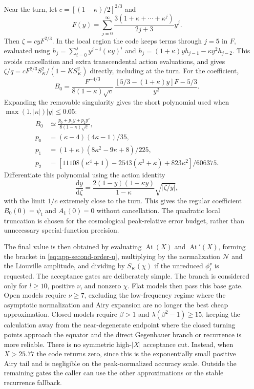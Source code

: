 \documentclass[11pt,a4paper]{article}
\newcommand{\dd}{\mathrm{d}}
\newcommand{\SK}{S_K}
\newcommand{\Ai}{\operatorname{Ai}}
\newcommand{\abs}[1]{\left|#1\right|}
\begin{document}
Near the turn, let \(c=[(1-\kappa)/2]^{2/3}\) and
\[
 F(y)=\sum_{j=0}^{\infty}
 \frac{3(1+\kappa+\cdots+\kappa^j)}{2j+3}y^j.
\]
Then \(\zeta=cyF^{2/3}\).  In the local region the code keeps terms through
\(j=5\) in \(F\), evaluated using \(h_j=\sum_{i=0}^j y^{j-i}(\kappa y)^i\)
and \(h_j=(1+\kappa)y h_{j-1}-\kappa y^2 h_{j-2}\).
This avoids cancellation and extra transcendental action evaluations, and
gives \(\zeta/q=cF^{2/3}\SK^2/(1-K\SK^2)\) directly, including at the turn.
For the coefficient,
\[
 B_0=\frac{F^{-4/3}}{8(1-\kappa)\sqrt c}\,
 \frac{[5/3-(1+\kappa)y]F-5/3}{y^2}.
\]
Expanding the removable singularity gives the short polynomial used when
\(\max(1,|\kappa|)|y|\le0.05\):
\begin{align}
 B_0&\simeq\frac{p_0+p_1y+p_2y^2}{8(1-\kappa)\sqrt c},\\
 p_0&=(\kappa-4)(4\kappa-1)/35,\\
 p_1&=(1+\kappa)(8\kappa^2-9\kappa+8)/225,\\
 p_2&=[11108(\kappa^4+1)-2543(\kappa^3+\kappa)+823\kappa^2]/606375.
\end{align}
Differentiate this polynomial using the action identity
\[
 \frac{\dd y}{\dd\zeta}
 =\frac{2(1-y)(1-\kappa y)}{1-\kappa}\sqrt{|\zeta/y|},
\]
with the limit \(1/c\) extremely close to the turn.  This gives the regular
coefficient \(B_0(0)=\psi_t\) and \(A_1(0)=0\) without cancellation.
The quadratic local truncation is chosen for the cosmological
peak-relative error budget, rather than unnecessary special-function precision.

The final value is then obtained by evaluating \(\Ai(X)\) and \(\Ai'(X)\),
forming the bracket in \eqref{eq:app-second-order-u}, multiplying by the
normalization \(\mathcal N\) and the Liouville amplitude, and
dividing by \(\SK(\chi)\) if the unreduced \(\phi_l^\nu\) is requested.  The
acceptance gates are deliberately simple.  The branch is considered only for
\(l\ge10\), positive \(\nu\), and nonzero \(\chi\).  Flat models then pass this
base gate.  Open models require \(\nu\ge7\), excluding the low-frequency regime
where the asymptotic normalization and Airy expansion are no longer the
best cheap approximation.  Closed models require \(\beta>1\) and
\(\lambda(\beta^2-1)\ge15\), keeping the calculation away from the
near-degenerate endpoint where the closed turning points approach the equator
and the direct Gegenbauer branch or recurrence is more reliable.  There is no symmetric high-\(\abs{X}\)
acceptance cut.  Instead, when \(X>25.77\) the code returns zero, since this is
the exponentially small positive Airy tail and is negligible on the
peak-normalized accuracy scale.  Outside the remaining gates the caller can use
the other approximations or the stable recurrence fallback.
\end{document}
